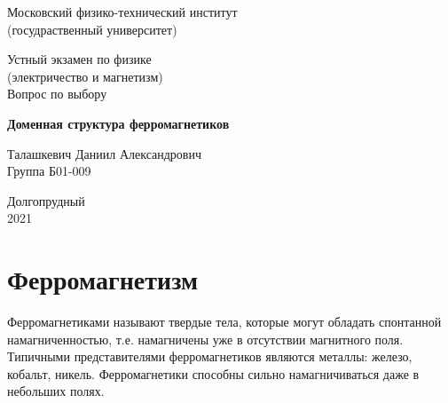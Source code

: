 \documentclass[a4paper,14pt]{article} %
\begin{document}


\begin{titlepage}

	\newpage
	\begin{center}
		\normalsize Московский физико-технический институт \\(госудраственный 			университет)
	\end{center}

	\vspace{6em}

	\begin{center}
		\Large Устный экзамен по физике \\(электричество и магнетизм) \\
        \Large Вопрос по выбору
	\end{center}

	\vspace{1em}

	\begin{center}
		\Large \textbf{Доменная структура ферромагнетиков}
	\end{center}

	\vspace{2em}

	\begin{center}
		\large Талашкевич Даниил Александрович\\
		Группа Б01-009
	\end{center}

	\vspace{\fill}

	\begin{center}
	Долгопрудный \\2021
	\end{center}
	
\end{titlepage}



	\thispagestyle{empty}
	\newpage
	\tableofcontents
	\newpage
	\setcounter{page}{1}


				
\section{Ферромагнетизм}

Ферромагнетиками называют твердые тела, которые могут обладать спонтанной намагниченностью, т.е. намагничены уже в отсутствии магнитного поля. Типичными представителями ферромагнетиков являются металлы: железо, кобальт, никель. Ферромагнетики способны сильно намагничиваться даже в небольших полях.
\end{document}
